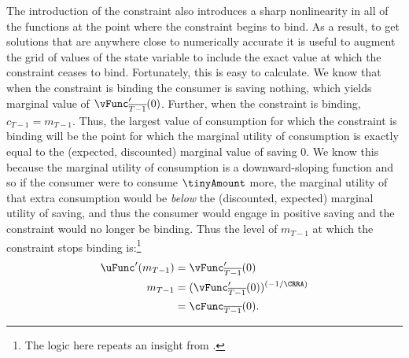 \documentclass[titlepage, headings=optiontotocandhead]{\econtex}
\begin{document}

The introduction of the constraint also introduces a sharp
nonlinearity in all of the functions at the point where the constraint
begins to bind.  As a result, to get solutions that are anywhere close
to numerically accurate it is useful to augment the grid of values of
the state variable to include the exact value at which the constraint
ceases to bind.  Fortunately, this is easy to calculate.  We know that
when the constraint is binding the consumer is saving nothing, which
yields marginal value of $\vFunc^{\prime}_{\overline{T-1}}(0)$. Further, when the
constraint is binding, ${c}_{T-1} = {m}_{T-1}$.  Thus, the largest
value of consumption for which the constraint is binding will be the
point for which the marginal utility of consumption is exactly equal
to the (expected, discounted) marginal value of saving 0.  We know
this because the marginal utility of consumption is a downward-sloping
function and so if the consumer were to consume $\tinyAmount$ more,
the marginal utility of that extra consumption would be \textit{below}
the (discounted, expected) marginal utility of saving, and thus the
consumer would engage in positive saving and the constraint would no
longer be binding.  Thus the level of ${m}_{T-1}$ at which the
constraint stops binding is:\footnote{The logic here repeats an insight from \cite{deatonLiqConstr}.}
\begin{equation}\begin{gathered}\begin{aligned}
      \uFunc^{\prime}({m}_{T-1})  & = \vFunc^{\prime}_{\overline{T-1}}(0)  \nonumber \\
      {m}_{T-1}  & = (\vFunc^{\prime}_{\overline{T-1}}(0))^{(-1/\CRRA)}  \nonumber
      \\        & = \cFunc_{\overline{T-1}}(0). \label{eq:LCbindsTm1}
    \end{aligned}\end{gathered}\end{equation}
\end{document}
